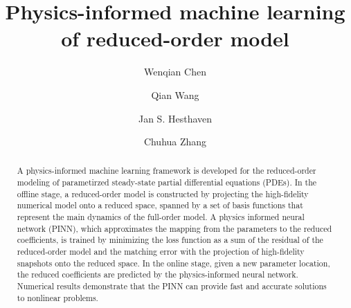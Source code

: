 \documentclass[preprint, 10pt]{elsarticle}
\begin{document}
	
\begin{frontmatter}



\title{Physics-informed machine learning of reduced-order model}


\author[XJTU]{Wenqian Chen}
\author[EPFL]{Qian Wang}
\author[EPFL]{Jan S. Hesthaven}
\author[XJTU]{Chuhua Zhang}
\address[XJTU]{Department of Fluid Machinery and Engineering, School of Energy and Power Engineering, Xi'an Jiaotong University, Xi'an, Shaanxi, People's Republic of China}
\address[EPFL]{Chair of Computational Mathematics and Simulation Science, \'Ecole polytechnique f\'ed\'erale de Lausanne, 1015 Lausanne, Switzerland}

\begin{abstract}
  \hspace{8pt} A physics-informed machine learning framework is developed for the reduced-order modeling of parametirzed steady-state partial differential equations (PDEs). In the offline stage, a reduced-order model is constructed by projecting the high-fidelity numerical model onto a reduced space, spanned by a set of basis functions that represent the main dynamics of the full-order model. A physics informed neural network (PINN), which approximates the mapping from the parameters to the reduced coefficients, is trained by minimizing the loss function as a sum of the residual of the reduced-order model and the matching error with the projection of high-fidelity snapshots onto the reduced space. In the online stage, given a new parameter location, the reduced coefficients are predicted by the physics-informed neural network. Numerical results demonstrate that the PINN can provide fast and accurate solutions to nonlinear problems.


\end{abstract}
\end{frontmatter}
\end{document}
